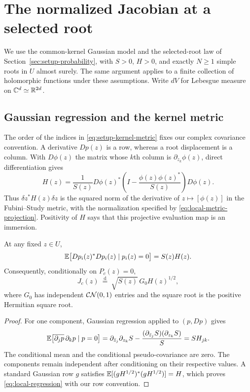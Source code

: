 \section{The normalized Jacobian at a selected root}
\label{sec:local-law}

We use the common-kernel Gaussian model and the selected-root law of
Section~\ref{sec:setup-probability}, with $S>0$, $H>0$, and exactly $N\ge1$
simple roots in $U$ almost surely. The same argument applies to a finite
collection of holomorphic functions under these assumptions. Write $dV$
for Lebesgue measure on $\mathbb C^d\simeq\mathbb R^{2d}$.

\subsection{Gaussian regression and the kernel metric}

The order of the indices in \eqref{eq:setup-kernel-metric} fixes our complex covariance
convention.  A derivative $Dp(z)$ is a row, whereas a root displacement is a
column.  With $D\phi(z)$ the matrix whose $k$th column is
$\partial_{z_k}\phi(z)$, direct differentiation gives
\begin{equation}\label{eq:local-metric-projection}
  H(z)=\frac1{S(z)}D\phi(z)^*
  \left(I-\frac{\phi(z)\phi(z)^*}{S(z)}\right)D\phi(z).
\end{equation}
Thus $\delta z^*H(z)\delta z$ is the squared norm of the derivative of
$z\mapsto[\phi(z)]$ in the Fubini--Study metric, with the normalization specified
by \eqref{eq:local-metric-projection}.  Positivity of $H$ says that this
projective evaluation map is an immersion.

\begin{lemma}\label{lem:local-regression}
  At any fixed $z\in U$,
  \[
    \mathbb E\bigl[Dp_i(z)^*Dp_i(z)\mid p_i(z)=0\bigr]=S(z)H(z).
  \]
  Consequently, conditionally on $P_c(z)=0$,
  \begin{equation}\label{eq:local-regression}
    J_c(z)\ \stackrel{\mathrm d}{=}\ \sqrt{S(z)}\,G_0 H(z)^{1/2},
  \end{equation}
  where $G_0$ has independent $\mathcal{CN}(0,1)$ entries and the square root is the
  positive Hermitian square root.
\end{lemma}

\begin{proof}
  For one component, Gaussian regression applied to $(p,Dp)$ gives
  \[
    \mathbb E\bigl[\overline{\partial_jp}\,\partial_kp\mid p=0\bigr]
    =\partial_{\bar z_j}\partial_{z_k}S
     -\frac{(\partial_{\bar z_j}S)(\partial_{z_k}S)}{S}
    =S H_{jk}.
  \]
  The conditional mean and the conditional pseudo-covariance are zero.
  The components remain independent after conditioning on their respective
  values.  A standard Gaussian row $g$ satisfies
  $\mathbb E[(gH^{1/2})^*(gH^{1/2})]=H$, which proves
  \eqref{eq:local-regression} with our row convention.
\end{proof}

